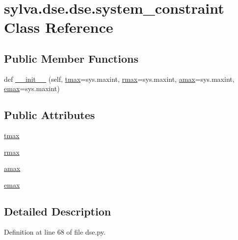 \hypertarget{classsylva_1_1dse_1_1dse_1_1system__constraint}{}\section{sylva.\+dse.\+dse.\+system\+\_\+constraint Class Reference}
\label{classsylva_1_1dse_1_1dse_1_1system__constraint}
\subsection*{Public Member Functions}
\begin{DoxyCompactItemize}
\item 
def \hyperlink{classsylva_1_1dse_1_1dse_1_1system__constraint_a523ed20f50972074b7ac58f0512e6a44}{\+\_\+\+\_\+init\+\_\+\+\_\+} (self, \hyperlink{classsylva_1_1dse_1_1dse_1_1system__constraint_a6c8109105f6fa2eab4eacf3f1bd2591c}{tmax}=sys.\+maxint, \hyperlink{classsylva_1_1dse_1_1dse_1_1system__constraint_a38b69b0cf3afa28bc94e76d7108434cd}{rmax}=sys.\+maxint, \hyperlink{classsylva_1_1dse_1_1dse_1_1system__constraint_a37c94dd85a091ca20492e0fdffde4d52}{amax}=sys.\+maxint, \hyperlink{classsylva_1_1dse_1_1dse_1_1system__constraint_a641790b89ace02df93adf6785d5fe372}{emax}=sys.\+maxint)
\end{DoxyCompactItemize}
\subsection*{Public Attributes}
\begin{DoxyCompactItemize}
\item 
\hyperlink{classsylva_1_1dse_1_1dse_1_1system__constraint_a6c8109105f6fa2eab4eacf3f1bd2591c}{tmax}
\item 
\hyperlink{classsylva_1_1dse_1_1dse_1_1system__constraint_a38b69b0cf3afa28bc94e76d7108434cd}{rmax}
\item 
\hyperlink{classsylva_1_1dse_1_1dse_1_1system__constraint_a37c94dd85a091ca20492e0fdffde4d52}{amax}
\item 
\hyperlink{classsylva_1_1dse_1_1dse_1_1system__constraint_a641790b89ace02df93adf6785d5fe372}{emax}
\end{DoxyCompactItemize}


\subsection{Detailed Description}


Definition at line 68 of file dse.\+py.



